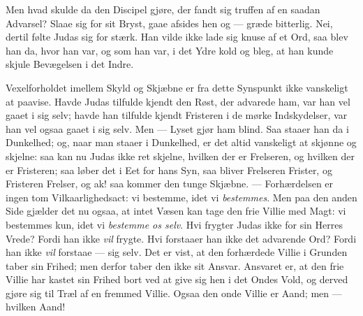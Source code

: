 \documentclass[12pt,a4paper]{book}
\begin{document}
Men hvad skulde da den Discipel gjøre, der fandt sig truffen af en saadan Advarsel? Slaae
sig for sit Bryst, gaae afsides hen og --- græde bitterlig. Nei, dertil følte Judas sig for
stærk. Han vilde ikke lade sig knuse af et Ord, saa blev han da, hvor han var, og som han
var, i det Ydre kold og bleg, at han kunde skjule Bevægelsen i det Indre.

Vexelforholdet imellem Skyld og Skjæbne er fra dette Synspunkt ikke vanskeligt at paavise.
Havde Judas tilfulde kjendt den Røst, der advarede ham, var han vel gaaet i sig selv; havde
han tilfulde kjendt Fristeren i de mørke Indskydelser, var han vel ogsaa gaaet i sig selv.
Men --- Lyset gjør ham blind. Saa staaer han da i Dunkelhed; og, naar man staaer i
Dunkelhed, er det altid vanskeligt at skjønne og skjelne: saa kan nu Judas ikke ret skjelne,
hvilken der er Frelseren, og hvilken der er Fristeren; saa løber det i Eet for hans Syn, saa
bliver Frelseren Frister, og Fristeren Frelser, og ak! saa kommer den tunge Skjæbne. ---
Forhærdelsen er ingen tom Vilkaarlighedsact: vi bestemme, idet vi \emph{bestemmes}. Men paa
den anden Side gjælder det nu ogsaa, at intet Væsen kan tage den frie Villie med Magt: vi
bestemmes kun, idet vi \emph{bestemme os selv}. Hvi frygter Judas ikke for sin Herres Vrede?
Fordi han ikke \emph{vil} frygte. Hvi forstaaer han ikke det advarende Ord? Fordi han ikke
\emph{vil} forstaae --- sig selv. Det er vist, at den forhærdede Villie i Grunden taber sin
Frihed; men derfor taber den ikke sit Ansvar. Ansvaret er, at den frie Villie har kastet sin
Frihed bort ved at give sig hen i det Ondes Vold, og derved gjøre sig til Træl af en fremmed
Villie. Ogsaa den onde Villie er Aand; men --- hvilken Aand!
\end{document}
